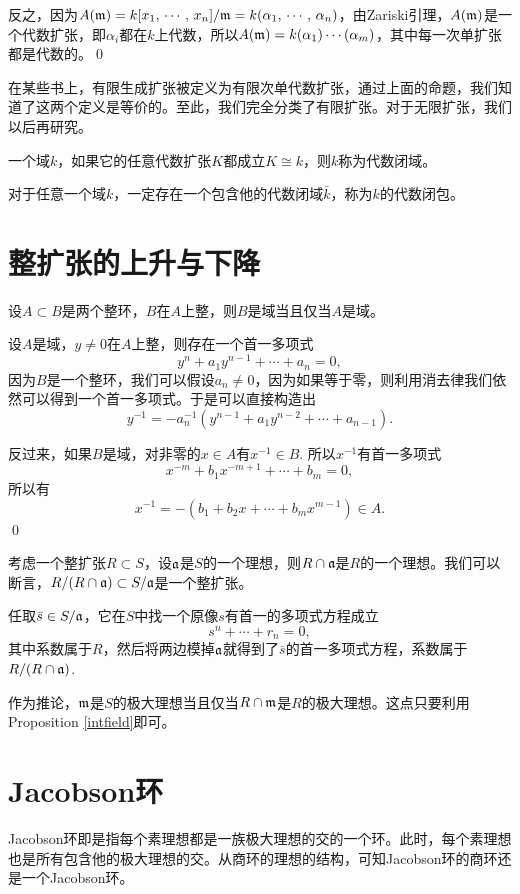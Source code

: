 反之，因为$A(\mathfrak{m})=k[x_1,\,\cdots,\,x_n]/\mathfrak{m}=k(\alpha_1,\,\cdots,\,\alpha_n)$，由Zariski引理，$A(\mathfrak{m})$是一个代数扩张，即$\alpha_i$都在$k$上代数，所以$A(\mathfrak{m})=k(\alpha_1)\cdots(\alpha_m)$，其中每一次单扩张都是代数的。\qed

在某些书上，有限生成扩张被定义为有限次单代数扩张，通过上面的命题，我们知道了这两个定义是等价的。至此，我们完全分类了有限扩张。对于无限扩张，我们以后再研究。

\para 一个域$k$，如果它的任意代数扩张$K$都成立$K\cong k$，则$k$称为代数闭域。

\theo 对于任意一个域$k$，一定存在一个包含他的代数闭域$\bar{k}$，称为$k$的代数闭包。

\section{整扩张的上升与下降}

\pro \label{intfield} 设$A\subset B$是两个整环，$B$在$A$上整，则$B$是域当且仅当$A$是域。

\proof
	设$A$是域，$y\neq 0$在$A$上整，则存在一个首一多项式
	\[
	y^n+a_1y^{n-1}+\cdots+a_n=0,
	\]
	因为$B$是一个整环，我们可以假设$a_n\neq 0$，因为如果等于零，则利用消去律我们依然可以得到一个首一多项式。于是可以直接构造出
	\[
	y^{-1}=-a_n^{-1}(y^{n-1}+a_1y^{n-2}+\cdots+a_{n-1}).
	\]

	反过来，如果$B$是域，对非零的$x\in A$有$x^{-1}\in B$. 所以$x^{-1}$有首一多项式
	\[
	x^{-m}+b_1x^{-m+1}+\cdots+b_m=0,
	\]
	所以有
	\[
	x^{-1}=-(b_1+b_2x+\cdots+b_mx^{m-1})\in A.
	\]
\qed

\para 考虑一个整扩张$R\subset S$，设$\mathfrak{a}$是$S$的一个理想，则$R\cap \mathfrak{a}$是$R$的一个理想。我们可以断言，$R/(R\cap \mathfrak{a})\subset S/\mathfrak{a}$是一个整扩张。

任取$\bar{s}\in S/\mathfrak{a}$，它在$S$中找一个原像$s$有首一的多项式方程成立
\[
	s^n+\cdots+r_n=0,
\]
其中系数属于$R$，然后将两边模掉$\mathfrak{a}$就得到了$\bar{s}$的首一多项式方程，系数属于$R/(R\cap \mathfrak{a})$.

作为推论，$\mathfrak{m}$是$S$的极大理想当且仅当$R\cap \mathfrak{m}$是$R$的极大理想。这点只要利用Proposition \eqref{intfield}即可。

\section{Jacobson环}

\para Jacobson环即是指每个素理想都是一族极大理想的交的一个环。此时，每个素理想也是所有包含他的极大理想的交。从商环的理想的结构，可知Jacobson环的商环还是一个Jacobson环。

